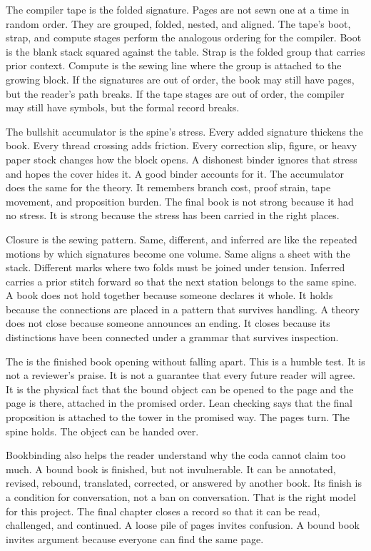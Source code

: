 The compiler tape is the folded signature. Pages are not sewn one at a time in
random order. They are grouped, folded, nested, and aligned. The tape's boot,
strap, and compute stages perform the analogous ordering for the compiler.
Boot is the blank stack squared against the table. Strap is the folded group
that carries prior context. Compute is the sewing line where the group is
attached to the growing block. If the signatures are out of order, the book
may still have pages, but the reader's path breaks. If the tape stages are out
of order, the compiler may still have symbols, but the formal record breaks.

The bullshit accumulator is the spine's stress. Every added signature thickens
the book. Every thread crossing adds friction. Every correction slip, figure,
or heavy paper stock changes how the block opens. A dishonest binder ignores
that stress and hopes the cover hides it. A good binder accounts for it. The
accumulator does the same for the theory. It remembers branch cost, proof
strain, tape movement, and proposition burden. The final book is not strong
because it had no stress. It is strong because the stress has been carried in
the right places.

Closure is the sewing pattern. Same, different, and inferred are like the
repeated motions by which signatures become one volume. Same aligns a sheet
with the stack. Different marks where two folds must be joined under tension.
Inferred carries a prior stitch forward so that the next station belongs to
the same spine. A book does not hold together because someone declares it
whole. It holds because the connections are placed in a pattern that survives
handling. A theory does not close because someone announces an ending. It
closes because its distinctions have been connected under a grammar that
survives inspection.

The  is the finished book opening without falling apart. This is
a humble test. It is not a reviewer's praise. It is not a guarantee that every
future reader will agree. It is the physical fact that the bound object can be
opened to the page and the page is there, attached in the promised order. Lean
checking  says that the final proposition is attached to
the tower in the promised way. The pages turn. The spine holds. The object can
be handed over.

Bookbinding also helps the reader understand why the coda cannot claim too
much. A bound book is finished, but not invulnerable. It can be annotated,
revised, rebound, translated, corrected, or answered by another book. Its
finish is a condition for conversation, not a ban on conversation. That is the
right model for this project. The final chapter closes a record so that it can
be read, challenged, and continued. A loose pile of pages invites confusion.
A bound book invites argument because everyone can find the same page.

